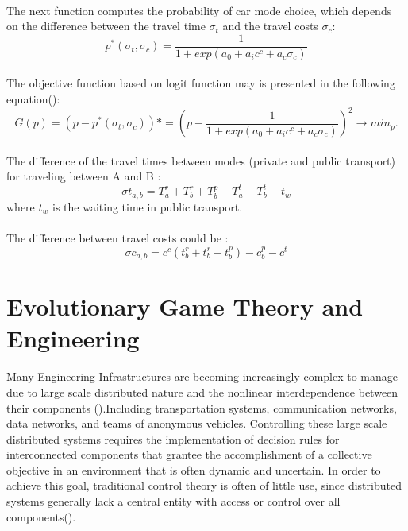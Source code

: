 \paragraph{}The next function computes the probability of car mode choice, which depends on the difference between the travel time $\sigma_t$ and the travel costs $\sigma_c$:
\begin{equation}
p^{*}(\sigma_t,\sigma_c) = \frac{1}{1+exp(a_0+ a_i c^c + a_c \sigma_c)}
\end{equation}
\paragraph{}The objective function based on logit function may is presented in the following equation(\cite{Hollander et al, 2006}):
\begin{equation}
G(p) = (p - p^{*}(\sigma_t,\sigma_c))*
	 = (p - \frac{1}{1+exp(a_0+ a_i c^c + a_c \sigma_c)})^2 \rightarrow min_p.
\end{equation}
\paragraph{}The difference of the travel times between modes (private
and public transport) for traveling between A and B :
\begin{equation}
\sigma t_{a,b} = T^{r}_a + T^{r}_b + T^{p}_b - T^{t}_a - T^{t}_b - t_w
\end{equation}
where $t_w$ is the waiting time in public transport.
\paragraph{}The difference between travel costs could be : 
\begin{equation}
\sigma c_{a,b} = c^{c} ( t^{r}_b + t^{r}_b - t^{p}_b )- c^{p}_b - c^t
\end{equation}

\section{Evolutionary Game Theory and Engineering}
\paragraph{}Many Engineering Infrastructures are becoming increasingly complex to manage due to large scale distributed nature and the nonlinear interdependence between their components (\cite{Quijano et al, 2017}).Including transportation systems, communication networks, data networks, and teams of anonymous vehicles. Controlling these large scale distributed systems requires the implementation of decision rules for interconnected components that grantee the accomplishment of a collective objective in an environment that is often dynamic and uncertain. In order to achieve this goal, traditional control theory is often of little use, since distributed systems generally lack a central  entity with access or control over all components(\cite{Marden and Shamma, 2015}).